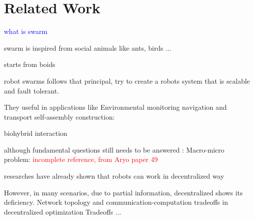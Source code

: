 \chapter{Related Work}
\label{ch2}


\textcolor{blue}{what is swarm}

swarm is inspired from social animals like ants, birds ... \cite{bonabeau1999swarm}

starts from boids \cite{reynolds1987flocks}

robot swarms follows that principal, try to create a robots system that is scalable and fault tolerant.
\cite{dorigo2014swarm}
\cite{dorigo2020reflections} %
\cite{dorigo2021swarm} %

They useful in applications like 
Environmental monitoring \cite{talamali2021less}
navigation and transport \cite{dorigo2013swarmanoid}
self-assembly \cite{rubenstein2014programmable}
construction: \cite{team2012designing} \cite{petersen2019review}

biohybrid interaction 
\cite{wahby2018autonomously}
\cite{halloy2007social}

although fundamental questions still needs to be answered : Macro-micro problem:
\cite{hamann2008framework}
\cite{hamann2010space}
\cite{hamann2018swarm}
\cite{hamann2013towards} %
\cite{valentini2015efficient} \textcolor{red}{incomplete reference, from Aryo paper 49}

researches have already shown that robots can work in decentralized way
\cite{dorigo2004evolving}
\cite{nouyan2009teamwork}
\cite{dorigo2013swarmanoid}
\cite{rubenstein2014programmable}
\cite{li2019decentralized}

However, in many scenarios, due to partial information, decentralized shows its deficiency.
\cite{eberhardinger2018approach}
\cite{eberhardinger2018measuring}
\cite{kaddoum2010criteria}
\cite{nedic2018network} Network topology and communication-computation tradeoffs in decentralized optimization
\cite{jovanovic2016controller} Tradeoffs ...

